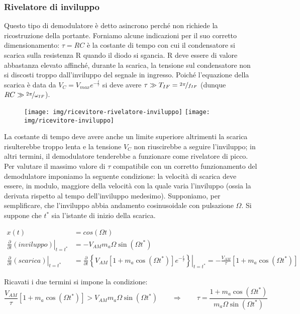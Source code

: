 \subsubsection{Rivelatore di inviluppo}
Questo tipo di demodulatore è detto asincrono perché non richiede la ricostruzione della portante. Forniamo alcune indicazioni per il suo corretto dimensionamento:
$\tau=RC$ è la costante di tempo con cui il condensatore si scarica sulla resistenza R quando il diodo si sgancia. R deve essere di valore abbastanza elevato affinché, durante la scarica, la tensione sul condensatore non si discosti troppo dall'inviluppo del segnale in ingresso. Poiché l'equazione della scarica è data da $V_C = V_{max}e^{-\frac{t}{\tau}}$ si deve avere $\tau \gg T_{IF}=\nicefrac{2\pi}{f_{IF}}$ (dunque $RC \gg \nicefrac{2\pi}{\omega_{IF}}$).

\begin{figure}[hbt]
	\centering
	\texttt{[image: img/ricevitore-rivelatore-inviluppo]}
	\texttt{[image: img/ricevitore-inviluppo]}
	\caption{}
	\label{fig:ricevitore-rivelatore-inviluppo}
\end{figure}


La costante di tempo deve avere anche un limite superiore altrimenti la scarica risulterebbe troppo lenta e la tensione $V_C$ non riuscirebbe a seguire l'inviluppo; in altri termini, il demodulatore tenderebbe a funzionare come rivelatore di picco. Per valutare il massimo valore di $\tau$ compatibile con un corretto funzionamento del demodulatore imponiamo la seguente condizione: la velocità di scarica deve essere, in modulo, maggiore della velocità con la quale varia l'inviluppo (ossia la derivata rispetto al tempo dell'inviluppo medesimo). Supponiamo, per semplificare, che l'inviluppo abbia andamento cosinusoidale con pulsazione $\Omega$. Si suppone che $t^*$ sia l'istante di inizio della scarica.

\begin{align*}
x(t) &= cos(\Omega t)
\\
\left. \frac{\partial}{\partial t}(inviluppo)\right|_{t=t^*} &= - V_{AM}  m_a \Omega\sin(\Omega t^*)
\\
\left. \frac{\partial}{\partial t}(scarica)\right|_{t=t^*} &=
\left. \frac{\partial}{\partial t}
\left\lbrace
V_{AM}[1+m_a\cos(\Omega t^*)]e^{-\frac{t}{\tau}}
\right\rbrace
\right|_{t=t^*}
= -\frac{V_{AM}}{\tau} [1+m_a\cos(\Omega t^*)]
\end{align*}

Ricavati i due termini si impone la condizione:
\[
\frac{V_{AM}}{\tau} [1+m_a\cos(\Omega t^*)]
>
V_{AM}  m_a \Omega\sin(\Omega t^*)
\qquad\Rightarrow\qquad
\tau=\frac{1+m_a\cos(\Omega t^*)}{m_a\Omega\sin(\Omega t^*)}
\]

